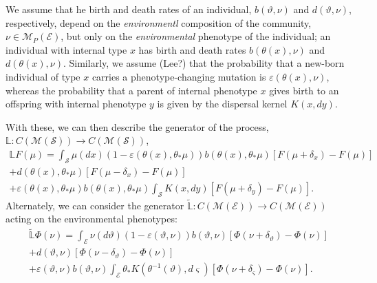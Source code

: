 \documentclass[11pt]{amsart}
\theoremstyle{remark}
\theoremstyle{definition}
\begin{document}

We assume that he birth and death rates of an individual, $b(\vartheta,\nu)$ and $d(\vartheta,\nu)$, respectively, depend on the \emph{environmentl} composition of the community, $\nu \in \mathcal{M}_{P}(\mathcal{E})$, but only on the \emph{environmental} phenotype of the individual; an individual with internal type $x$ has birth and death rates $b(\theta(x),\nu)$ and $d(\theta(x),\nu)$.  Similarly, we assume (Lee?) that the probability that a new-born individual of type $x$ carries a phenotype-changing mutation is $\varepsilon(\theta(x),\nu)$, whereas the probability that a parent of internal phenotype $x$ gives birth to an offspring with internal phenotype $y$ is given by the dispersal kernel $K(x,dy)$. 

With these, we can then describe the generator of the process, $\mathbb{L}:C(\mathcal{M}(\mathcal{S})) \longrightarrow C(\mathcal{M}(\mathcal{S}))$,
\begin{multline}\label{GENI}
	\mathbb{L}F(\mu) = \int_{\mathcal{S}} \mu(dx) (1-\varepsilon(\theta(x),\theta_{*}\mu)) b(\theta(x),\theta_{*}\mu)[F(\mu+\delta_{x})-F(\mu)]\\
	+ d(\theta(x),\theta_{*}\mu)[F(\mu-\delta_{x})-F(\mu)]\\
	+ \varepsilon(\theta(x),\theta_{*}\mu) b(\theta(x),\theta_{*}\mu)\int_{\mathcal{S}} K(x,dy)[F(\mu+\delta_{y})-F(\mu)].
\end{multline}
Alternately, we can consider the generator $\tilde{\mathbb{L}}:C(\mathcal{M}(\mathcal{E})) \longrightarrow C(\mathcal{M}(\mathcal{E}))$ acting on the environmental phenotypes: 
\begin{multline}\label{GENE}
	\tilde{\mathbb{L}}\Phi(\nu)
	 = \int_{\mathcal{E}} \nu(d\vartheta) (1-\varepsilon(\vartheta,\nu)) b(\vartheta,\nu)[\Phi(\nu+\delta_{\vartheta})-\Phi(\nu)]\\
	+ d(\vartheta,\nu)[\Phi(\nu-\delta_{\vartheta})-\Phi(\nu)]\\
	+ \varepsilon(\vartheta,\nu) b(\vartheta,\nu)
		\int_{\mathcal{E}} \theta_{*}K(\theta^{-1}(\vartheta),d\varsigma)[\Phi(\nu+\delta_{\varsigma})-\Phi(\nu)].
\end{multline}
	
\end{document}
